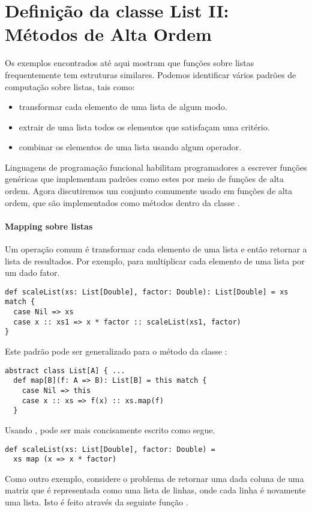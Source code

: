 \section{Definição da classe List II: Métodos de Alta Ordem}
Os exemplos encontrados até aqui mostram que funções sobre listas frequentemente 
tem estruturas similares. Podemos identificar vários padrões de computação sobre
listas, tais como:

\begin{itemize}
        \item transformar cada elemento de uma lista de algum modo.
        \item extrair de uma lista todos os elementos que satisfaçam uma critério.
        \item combinar os elementos de uma lista usando algum operador.
\end{itemize}
Linguagens de programação funcional habilitam programadores a escrever funções genéricas
que implementam padrões como estes por meio de funções de alta ordem. Agora discutiremos
um conjunto comumente usado em funções de alta ordem, que são implementados como métodos 
dentro da classe . 
\paragraph{Mapping sobre listas}
Um operação comum é transformar cada elemento de uma lista e então retornar a lista de
resultados. Por exemplo, para multiplicar cada elemento de uma lista por um dado fator.
\begin{lstlisting}
def scaleList(xs: List[Double], factor: Double): List[Double] = xs match {
  case Nil => xs
  case x :: xs1 => x * factor :: scaleList(xs1, factor)
}
\end{lstlisting}
Este padrão pode ser generalizado para o método  da classe :
\begin{lstlisting}
abstract class List[A] { ...
  def map[B](f: A => B): List[B] = this match {
    case Nil => this
    case x :: xs => f(x) :: xs.map(f)
  }
\end{lstlisting}
Usando ,  pode ser mais concisamente escrito como segue.
\begin{lstlisting}
def scaleList(xs: List[Double], factor: Double) =
  xs map (x => x * factor)
\end{lstlisting}

Como outro exemplo, considere o problema de retornar uma dada coluna de uma matriz 
que é representada como uma lista de linhas, onde cada linha é novamente uma lista. 
Isto é feito através da seguinte função . 

